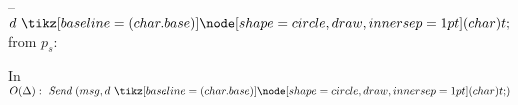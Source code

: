 \begin{bbox}[title={$\F_{\msf{sync-chan}(p_s, p_r, r, \Delta)}$}]

-- \OnInput {} $d \token$ from $p_s$:

	\qquad In $O(\Delta): ~\Send (msg, d \token)$
	
\end{bbox}
